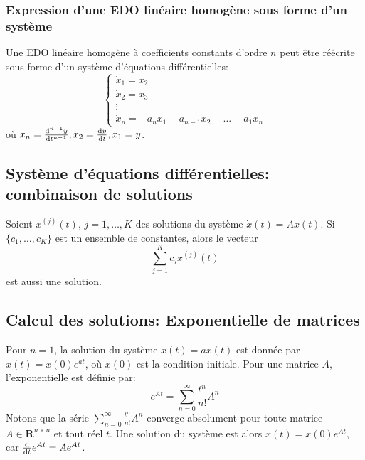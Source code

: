             \subsubsection{Expression d'une EDO linéaire homogène sous forme d'un système}
                Une EDO linéaire homogène à coefficients constants d'ordre $n$ peut être réécrite sous forme d'un système d'équations différentielles:
                \begin{equation}
                    \begin{cases}
                        \dot{x}_1=x_2 \\
                        \dot{x}_2=x_3 \\
                        \vdots \\
                        \dot{x}_n=-a_n x_1 - a_{n-1} x_2 - \dots - a_1 x_n
                    \end{cases}
                \end{equation}
                où $x_n=\frac {\mathrm d^{n-1}{y}}{\mathrm d{t}^{n-1}}, x_2=\frac {\mathrm d{y}}{\mathrm d{t}}, x_1=y$.
        
        \subsection{Système d'équations différentielles: combinaison de solutions}
            \begin{lemma}{} 
                Soient $x^{(j)}(t) $, $j=1, \ldots, K$ des solutions du système $\dot{x}(t)=Ax(t)$. Si $\{c_1, \ldots, c_K\}$ est un ensemble de constantes, alors le vecteur
                \begin{equation}
                    \sum_{j=1}^K c_j x^{(j)}(t)
                \end{equation}
                est aussi une solution. 
            \end{lemma}
        
        \subsection{Calcul des solutions: Exponentielle de matrices}
            Pour $n=1 $, la solution du système $\dot{x}(t)=ax(t)$ est donnée par $x(t)=x(0) e^{at}$, où $x(0)$ est la condition initiale. Pour une matrice $A$, l'exponentielle est définie par:
            \begin{equation}
                e^{At}=\sum_{n=0}^{\infty} \frac{t^n}{n!} A^n
            \end{equation}
            Notons que la série $\sum_{n=0}^{\infty} \frac{t^n}{n!} A^n$ converge absolument pour toute matrice $A \in \mathbf{R}^{n\times n}$ et tout réel $t$.
            Une solution du système est alors $x(t)=x(0) e^{At}$, car $\frac {\mathrm d{}}{\mathrm d{t}}e^{At}=A e^{At}$.
        
